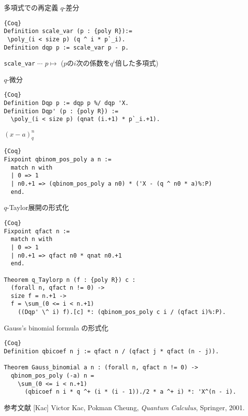 \documentclass[unicode,mathserif]{beamer}
\begin{document}
\begin{frame}[fragile]
\begin{columns}[T]
\begin{column}{0.33\columnwidth}
		\begin{block}{多項式での再定義}
			$q$-差分
			\begin{lstlisting}{Coq}
Definition scale_var (p : {poly R}):=
 \poly_(i < size p) (q ^ i * p`_i).
Definition dqp p := scale_var p - p. \end{lstlisting}
{\tt scale\_var} $\cdots$ $p \mapsto$ ($p$の$i$次の係数を$q^i$倍した多項式)

			$q$-微分
			\begin{lstlisting}{Coq}
Definition Dqp p := dqp p %/ dqp 'X.
Definition Dqp' (p : {poly R}) :=
  \poly_(i < size p) (qnat (i.+1) * p`_i.+1). \end{lstlisting}

			$(x - a)^n_q$
			\begin{lstlisting}{Coq}
Fixpoint qbinom_pos_poly a n :=
  match n with
  | 0 => 1
  | n0.+1 => (qbinom_pos_poly a n0) * ('X - (q ^ n0 * a)%:P)
  end. \end{lstlisting}
		\end{block}

		\begin{block}{$q$-Taylor展開の形式化}
			\begin{lstlisting}{Coq}
Fixpoint qfact n :=
  match n with
  | 0 => 1
  | n0.+1 => qfact n0 * qnat n0.+1
  end.

Theorem q_Taylorp n (f : {poly R}) c :
  (forall n, qfact n != 0) ->
  size f = n.+1 ->
  f = \sum_(0 <= i < n.+1)
    ((Dqp' \^ i) f).[c] *: (qbinom_pos_poly c i / (qfact i)%:P).
\end{lstlisting}
		\end{block}
		
		\begin{block}{Gauss's binomial formula の形式化}
			\begin{lstlisting}{Coq}
Definition qbicoef n j := qfact n / (qfact j * qfact (n - j)).

Theorem Gauss_binomial a n : (forall n, qfact n != 0) ->
  qbinom_pos_poly (-a) n =
    \sum_(0 <= i < n.+1)
      (qbicoef n i * q ^+ (i * (i - 1))./2 * a ^+ i) *: 'X^(n - i). \end{lstlisting}
		\end{block}

		\begin{block}{参考文献}
			[Kac] Victor Kac, Pokman Cheung, {\it{Quantum Calculus}}, Springer, 2001.
		\end{block}
			
	\end{column}
	\end{columns}
\end{frame}
\end{document}
